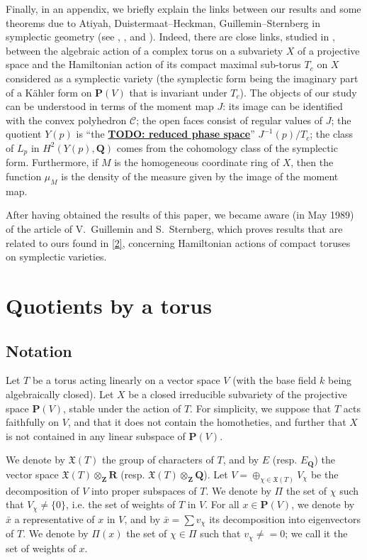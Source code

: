 \documentclass{article}
\newcommand{\PP}{\mathbf{P}}
\newcommand{\QQ}{\mathbf{Q}}
\newcommand{\ZZ}{\mathbf{Z}}
\newcommand{\RR}{\mathbf{R}}
\newcommand{\unsure}[1]{\underline{\textbf{TODO: #1}}}
\newcommand{\oldpage}[1]{\marginpar{\footnotesize$\Big\vert$ \textit{p.~#1}}}
\begin{document}
Finally, in an appendix, we briefly explain the links between our results and some theorems due to Atiyah, Duistermaat--Heckman, Guillemin--Sternberg in symplectic geometry (see \cite{Ati}, \cite{DH12}, and \cite{GS12}).
Indeed, there are close links, studied in \cite{Kir}, between the algebraic action of a complex torus on a subvariety $X$ of a projective space and the Hamiltonian action of its compact maximal sub-torus $T_c$ on $X$ considered as a symplectic variety (the symplectic form being the imaginary part of a K\"{a}hler form on $\PP(V)$ that is invariant under $T_c$).
The objects of our study can be understood in terms of the moment map $J$:
its image can be identified with the convex polyhedron $\mathcal{C}$;
the open faces consist of regular values of $J$;
the quotient $Y(p)$ is ``the \unsure{reduced phase space}'' $J^{-1}(p)/T_c$;
the class of $L_p$ in $H^2(Y(p),\QQ)$ comes from the cohomology class of the symplectic form.
Furthermore, if $M$ is the homogeneous coordinate ring of $X$, then the function $\mu_M$ is the density of the measure given by the image of the moment map.

After having obtained the results of this paper, we became aware (in May 1989) of the article \cite{GS3} of V.~Guillemin and S.~Sternberg, which proves results that are related to ours found in \cref{2}, concerning Hamiltonian actions of compact toruses on symplectic varieties.


\section{Quotients by a torus}
\label{1}

\subsection{Notation}
\label{1.1}

Let $T$ be a torus acting linearly on a vector space $V$ (with the base field $k$ being algebraically closed).
Let $X$ be a closed irreducible subvariety of the projective space $\PP(V)$, stable under the action of $T$.
For simplicity, we suppose
\oldpage{512}
that $T$ acts faithfully on $V$, and that it does not contain the homotheties, and further that $X$ is not contained in any linear subspace of $\PP(V)$.

We denote by $\mathfrak{X}(T)$ the group of characters of $T$, and by $E$ (resp. $E_\QQ$) the vector space $\mathfrak{X}(T)\otimes_\ZZ\RR$ (resp. $\mathfrak{X}(T)\otimes_\ZZ\QQ$).
Let $V=\oplus_{\chi\in\mathfrak{X}(T)}V_\chi$ be the decomposition of $V$ into proper subspaces of $T$.
We denote by $\Pi$ the set of $\chi$ such that $V_\chi\neq\{0\}$, i.e. the set of weights of $T$ in $V$.
For all $x\in\PP(V)$, we denote by $\bar{x}$ a representative of $x$ in $V$, and by $\bar{x}=\sum v_\chi$ its decomposition into eigenvectors of $T$.
We denote by $\Pi(x)$ the set of $\chi\in\Pi$ such that $v_\chi\neq=0$;
we call it the set of weights of $x$.
\end{document}
